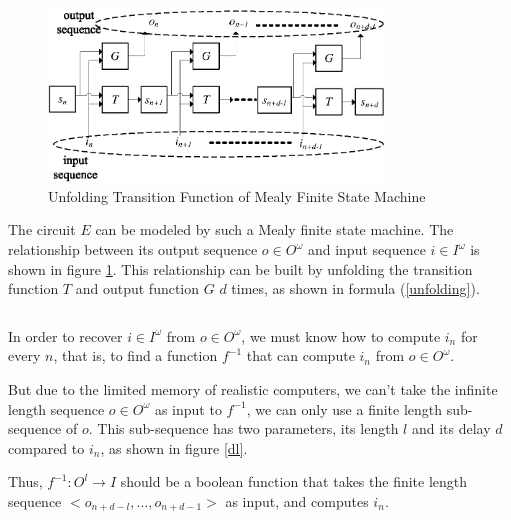 \documentclass[journal]{IEEEtran}
\begin{document}
\vspace{0.2cm}


\begin{figure}[t]
\centering
\includegraphics[width=3.5in]{mealy}
\caption{Unfolding Transition Function of Mealy Finite State Machine}
\label{mealyfsm_unfolding}
\end{figure}

The circuit $E$ can be modeled by such a Mealy finite state machine.
The relationship between its output sequence $o\in O^{\omega}$ and input sequence $i\in I^{\omega}$ is shown in figure \ref{mealyfsm_unfolding}.
This relationship can be built by unfolding the transition function $T$ and output function $G$ $d$ times,
as shown in formula (\ref{unfolding}).

\begin{equation}\label{unfolding}
\end{equation}

In order to recover $i\in I^{\omega}$ from $o\in O^{\omega}$,
we must know how to compute $i_n$ for every $n$,
that is, to find a function $f^{-1}$ that can compute $i_n$ from $o\in O^{\omega}$.

But due to the limited memory of realistic computers,
we can't take the infinite length sequence $o\in O^{\omega}$ as input to $f^{-1}$,
we can only use a finite length sub-sequence of $o$.
This sub-sequence has two parameters,
its length $l$ and its delay $d$ compared to $i_n$, as shown in figure \ref{dl}.

Thus,
$f^{-1}:O^l\to I$ should be a boolean function that takes the finite length sequence $<o_{n+d-l},\dots , o_{n+d-1} >$ as input,
and computes $i_n$.
\end{document}
